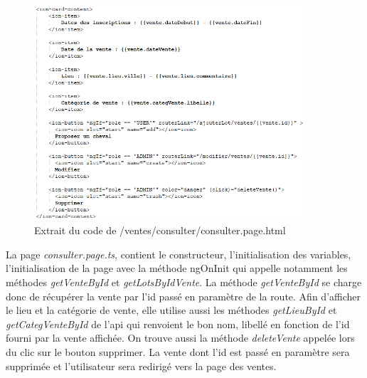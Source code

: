 			\begin{figure}[H]
				\centering\includegraphics[width=0.9\textwidth, keepaspectratio]{res/consulter.png}
				\caption{Extrait du code de /ventes/consulter/consulter.page.html}
			\end{figure}

			La page \textit{consulter.page.ts}, contient le constructeur, l'initialisation des variables, l'initialisation de la page avec la méthode ngOnInit qui appelle notamment les méthodes \textit{getVenteById} et \textit{getLotsByIdVente}.\newline
			La méthode \textit{getVenteById} se charge donc de récupérer la vente par l'id passé en paramètre de la route. Afin d'afficher le lieu et la catégorie de vente, elle utilise aussi les méthodes \textit{getLieuById} et \textit{getCategVenteById} de l'api qui renvoient le bon nom, libellé en fonction de l'id fourni par la vente affichée.\newline
			On trouve aussi la méthode \textit{deleteVente} appelée lors du clic sur le bouton supprimer. La vente dont l'id est passé en paramètre sera supprimée et l'utilisateur sera redirigé vers la page des ventes.

